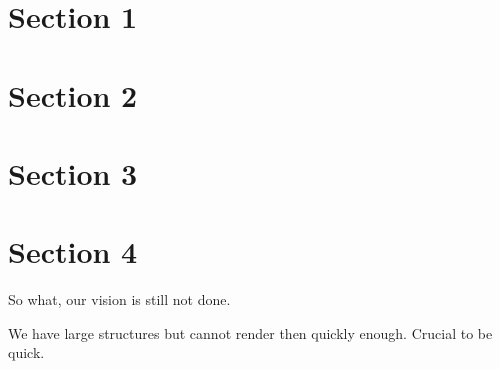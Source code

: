 \section{Section 1}

\section{Section 2}

\section{Section 3}

\section{Section 4}

So what, our vision is still not done.

We have large structures but cannot render then quickly enough.
Crucial to be quick.



%

